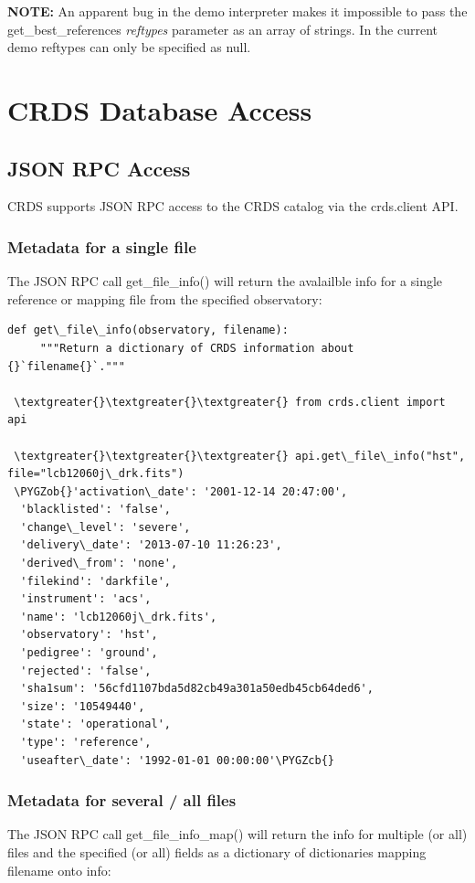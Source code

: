 \documentclass[letterpaper,10pt,english]{sphinxmanual}
\def\PYGZob{\char`\{}
\def\PYGZcb{\char`\}}
\begin{document}
\textbf{NOTE:} An apparent bug in the demo interpreter makes it impossible to pass
the get\_best\_references \emph{reftypes} parameter as an array of strings.   In the
current demo reftypes can only be specified as null.


\chapter{CRDS Database Access}
\label{database:crds-database-access}\label{database::doc}

\section{JSON RPC Access}
\label{database:json-rpc-access}
CRDS supports JSON RPC access to the CRDS catalog via the crds.client API.


\subsection{Metadata for a single file}
\label{database:metadata-for-a-single-file}
The JSON RPC call get\_file\_info() will return the avalailble info for a single reference
or mapping file from the specified observatory:

\begin{Verbatim}[commandchars=\\\{\}]
def get\_file\_info(observatory, filename):
     """Return a dictionary of CRDS information about {}`filename{}`."""

 \textgreater{}\textgreater{}\textgreater{} from crds.client import api

 \textgreater{}\textgreater{}\textgreater{} api.get\_file\_info("hst", file="lcb12060j\_drk.fits")
 \PYGZob{}'activation\_date': '2001-12-14 20:47:00',
  'blacklisted': 'false',
  'change\_level': 'severe',
  'delivery\_date': '2013-07-10 11:26:23',
  'derived\_from': 'none',
  'filekind': 'darkfile',
  'instrument': 'acs',
  'name': 'lcb12060j\_drk.fits',
  'observatory': 'hst',
  'pedigree': 'ground',
  'rejected': 'false',
  'sha1sum': '56cfd1107bda5d82cb49a301a50edb45cb64ded6',
  'size': '10549440',
  'state': 'operational',
  'type': 'reference',
  'useafter\_date': '1992-01-01 00:00:00'\PYGZcb{}
\end{Verbatim}


\subsection{Metadata for several / all files}
\label{database:metadata-for-several-all-files}
The JSON RPC call get\_file\_info\_map() will return the info for multiple (or all) files
and the specified (or all) fields as a dictionary of dictionaries mapping filename onto info:
\end{document}
